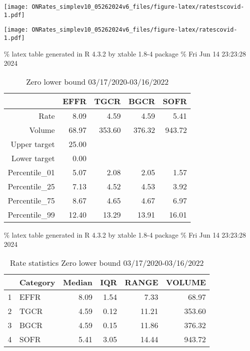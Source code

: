 \documentclass[
]{article}
\let\origfigure\figure
\let\endorigfigure\endfigure
\renewenvironment{figure}[1][2] {
    \expandafter\origfigure\expandafter[H]
} {
    \endorigfigure
}
\begin{document}
\begin{figure}
\centering
\texttt{[image: ONRates\_simplev10\_05262024v6\_files/figure-latex/ratestscovid-1.pdf]}
\caption{\label{fig:ratestscovid}Rates during covid 11/1/2019-3/16/2020}
\end{figure}

\begin{figure}
\centering
\texttt{[image: ONRates\_simplev10\_05262024v6\_files/figure-latex/ratescovid-1.pdf]}
\caption{\label{fig:ratescovid}EFFR during covid period 11/1/2019-3/16/2020}
\end{figure}

\% latex table generated in R 4.3.2 by xtable 1.8-4 package
\% Fri Jun 14 23:23:28 2024

\begin{table}[ht]
\centering
\begin{tabular}{rrrrr}
  \hline
 & EFFR & TGCR & BGCR & SOFR \\ 
  \hline
Rate & 8.09 & 4.59 & 4.59 & 5.41 \\ 
  Volume & 68.97 & 353.60 & 376.32 & 943.72 \\ 
  Upper target & 25.00 &  &  &  \\ 
  Lower target & 0.00 &  &  &  \\ 
  Percentile\_01 & 5.07 & 2.08 & 2.05 & 1.57 \\ 
  Percentile\_25 & 7.13 & 4.52 & 4.53 & 3.92 \\ 
  Percentile\_75 & 8.67 & 4.65 & 4.67 & 6.97 \\ 
  Percentile\_99 & 12.40 & 13.29 & 13.91 & 16.01 \\ 
   \hline
\end{tabular}
\caption{Zero lower bound 03/17/2020-03/16/2022} 
\end{table}

\% latex table generated in R 4.3.2 by xtable 1.8-4 package
\% Fri Jun 14 23:23:28 2024

\begin{table}[ht]
\centering
\begin{tabular}{rlrrrr}
  \hline
 & Category & Median & IQR & RANGE & VOLUME \\ 
  \hline
1 & EFFR & 8.09 & 1.54 & 7.33 & 68.97 \\ 
  2 & TGCR & 4.59 & 0.12 & 11.21 & 353.60 \\ 
  3 & BGCR & 4.59 & 0.15 & 11.86 & 376.32 \\ 
  4 & SOFR & 5.41 & 3.05 & 14.44 & 943.72 \\ 
   \hline
\end{tabular}
\caption{Rate statistics Zero lower bound 03/17/2020-03/16/2022} 
\end{table}
\end{document}
